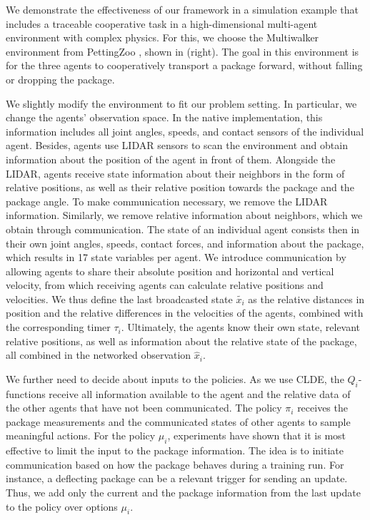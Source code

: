 \documentclass[12pt, final]{l4dc2023}
\begin{document}
We demonstrate the effectiveness of our framework in a simulation example that includes a traceable cooperative task in a high-dimensional multi-agent environment with complex physics. 
For this, we choose the Multiwalker environment from PettingZoo \citep{Terry.2021}, shown in  (right). 
The goal in this environment is for the three agents to cooperatively transport a package forward, without falling or dropping the package.

We slightly modify the environment to fit our problem setting.
In particular, we change the agents' observation space. 
In the native implementation, this information includes all joint angles, speeds, and contact sensors of the individual agent. Besides, agents use LIDAR sensors to scan the environment and obtain information about the position of the agent in front of them. 
Alongside the LIDAR, agents receive state information about their neighbors in the form of relative positions, as well as their relative position towards the package and the package angle.
To make communication necessary, we remove the LIDAR information. Similarly, we remove relative information about neighbors, which we obtain through communication.
The state of an individual agent consists then in their own joint angles, speeds, contact forces, and information about the package, which results in 17 state variables per agent.
We introduce communication by allowing agents to share their absolute position and horizontal and vertical velocity, from which receiving agents can calculate relative positions and velocities.
We thus define the last broadcasted state $\tilde{x_i}$ as the relative distances in position and the relative differences in the velocities of the agents, combined with the corresponding timer $\tau_i$. Ultimately, the agents know their own state, relevant relative positions, as well as information about the relative state of the package, all combined in the networked observation $\hat{x}_i$.  

We further need to decide about inputs to the policies.
As we use CLDE, the $Q_i$-functions receive all information available to the agent and the relative data of the other agents that have not been communicated. The policy $\pi_i$ receives the package measurements and the communicated states of other agents to sample meaningful actions.
For the policy $\mu_i$, experiments have shown that it is most effective to limit the input to the package information. The idea is to initiate communication based on how the package behaves during a training run. For instance, a deflecting package can be a relevant trigger for sending an update. Thus, we add only the current and the package information from the last update to the policy over options $\mu_i$. 
\end{document}

